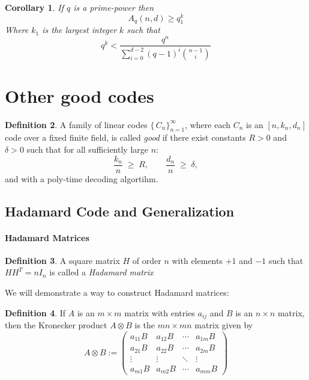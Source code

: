 \documentclass[11pt,a4paper]{article}
\theoremstyle{definition}
\newtheorem{definition}{Definition}[section]
\theoremstyle{plain}
\newtheorem{corollary}[definition]{Corollary}
\theoremstyle{remark}
\begin{document}
\begin{corollary}
    If $q$ is a prime-power then 
    $$A_q(n,d) \geq q^k_1$$
    Where $k_1$ is the largest integer $k$ such that 
    $$q^k < \frac{q^n}{\sum_{i = 0}^{d-2} (q-1)^i \binom{n-1}{i}}$$
\end{corollary} 

\section{Other good codes} 


\begin{definition}
A family of linear codes $\{\,C_n\}_{n=1}^\infty$, where each $C_n$ is an $[n,k_n,d_n]$ code over a fixed finite field, is called \emph{good} if there exist constants $R>0$ and $\delta>0$ such that for all sufficiently large $n$:
\[
\frac{k_n}{n} \;\ge\; R,
\qquad
\frac{d_n}{n} \;\ge\; \delta,
\]
and with a poly-time decoding algortihm. 
\end{definition}

\subsection{Hadamard Code and Generalization} 

\paragraph{Hadamard Matrices}
\begin{definition}
    A square matrix $H$ of order $n$ with elements $+1$ and $-1$ such that 
    $H H^T = n I_n$ is called a \emph{Hadamard matrix} 
\end{definition}

We will demonstrate a way to construct Hadamard matrices: 

\begin{definition}
    If $A$ is an $m \times m$ matrix with entries $a_{ij}$ and $B$ is an $n \times n$ matrix, then the Kronecker product 
    $A \otimes B$ is the $mn \times mn$ matrix given by 
    $$A \otimes B := \begin{pmatrix}
        a_{11}B & a_{12}B & \cdots & a_{1m}B \\
        a_{21}B & a_{22} B & \cdots & a_{2m} B \\
        \vdots & \vdots & \ddots & \vdots \\
        a_{m1} B & a_{m2} B & \cdots & a_{mm} B 
    \end{pmatrix}$$
\end{definition}
\end{document}

